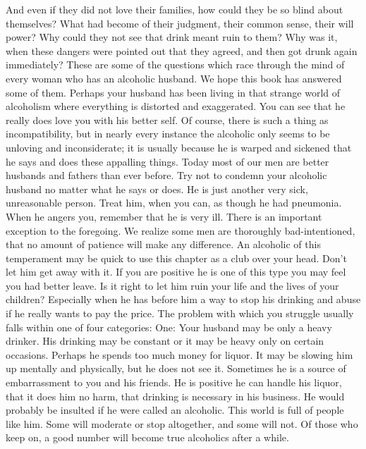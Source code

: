 \begin{biblechapter}
And even if they did not love their families, how could they be so blind about themselves?  What had become of their judgment, their common sense, their will power?  Why could they not see that drink meant ruin to them?  Why was it, when these dangers were pointed out that they agreed, and then got drunk again immediately?
These are some of the questions which race through the mind of every woman who has an alcoholic husband.  We hope this book has answered some of them.  Perhaps your husband has been living in that strange world of alcoholism where everything is distorted and exaggerated.  You can see that he really does love you with his better self.  Of course, there is such a thing as incompatibility, but in nearly every instance the alcoholic only seems to be unloving and inconsiderate; it is usually because he is warped and sickened that he says and does these appalling things.  Today most of our men are better husbands and fathers than ever before.
Try not to condemn your alcoholic husband no matter what he says or does.  He is just another very sick, unreasonable person.  Treat him, when you can, as though he had pneumonia.  When he angers you, remember that he is very ill.
There is an important exception to the foregoing.  We realize some men are thoroughly bad-intentioned, that no amount of patience will make any difference.  An alcoholic of this temperament may be quick to use this chapter as a club over your head.  Don't let him get away with it.  If you are positive he is one of this type you may feel you had better leave.  Is it right to let him ruin your life and the lives of your children?  Especially when he has before him a way to stop his drinking and abuse if he really wants to pay the price.
The problem with which you struggle usually falls within one of four categories:
One:  Your husband may be only a heavy drinker.  His drinking may be constant or it may be heavy only on certain occasions.  Perhaps he spends too much money for liquor.  It may be slowing him up mentally and physically, but he does not see it.  Sometimes he is a source of embarrassment to you and his friends.  He is positive he can handle his liquor, that it does him no harm, that drinking is necessary in his business.  He would probably be insulted if he were called an alcoholic.  This world is full of people like him.  Some will moderate or stop altogether, and some will not.  Of those who keep on, a good number will become true alcoholics after a while.

\end{biblechapter}
